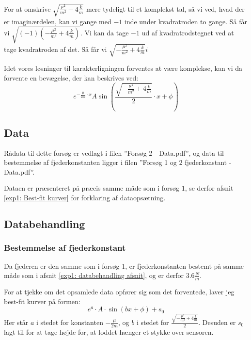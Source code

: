 For at omskrive $\sqrt{\frac{\mu^2}{m^2}-4\frac{k}{m}}$ mere tydeligt til et komplekst tal, så vi ved, hvad der er imaginærdelen, kan vi gange med $-1$ inde under kvadratroden to gange. 
Så får vi $\sqrt{(-1)(-\frac{\mu^2}{m^2}+4\frac{k}{m})}$.
Vi kan da tage $-1$ ud af kvadratrodstegnet ved at tage kvadratroden af det. 
Så får vi $\sqrt{-\frac{\mu^2}{m^2}+4\frac{k}{m}}i$

Idet vores løsninger til karakterligningen forventes at være komplekse, kan vi da forvente en bevægelse, der kan beskrives ved:
$$e^{-\frac{\mu}{2m} \cdot x}A\sin(\frac{\sqrt{-\frac{\mu^2}{m^2}+4\frac{k}{m}}}{2} \cdot x+\phi)$$
\subsection{Data}
Rådata til dette forsøg er vedlagt i filen ''Forsøg 2 - Data.pdf'', og data til bestemmelse af fjederkonstanten ligger i filen ''Forsøg 1 og 2 fjederkonstant - Data.pdf''. 

Dataen er præsenteret på præcis samme måde som i forsøg 1, se derfor afsnit \ref{exp1: Best-fit kurver} for forklaring af dataopsætning.



\subsection{Databehandling}
\subsubsection{Bestemmelse af fjederkonstant}
Da fjederen er den samme som i forsøg 1, er fjederkonstanten bestemt på samme måde som i afsnit \ref{exp1: databehandling afsnit}, og er derfor $3.6\frac{N}{m}$.

For at tjekke om det opsamlede data opfører sig som det forventede, laver jeg best-fit kurver på formen:
$$e^a \cdot A \cdot \sin (bx+\phi)+s_0$$
Her står $a$ i stedet for konstanten $-\frac{\mu}{2m}$, og $b$ i stedet for 
$\frac{\sqrt{-\frac{\mu^2}{m^2}+4\frac{k}{m}}}{2}$.
Desuden er $s_0$ lagt til for at tage højde for, at loddet hænger et stykke over sensoren.

